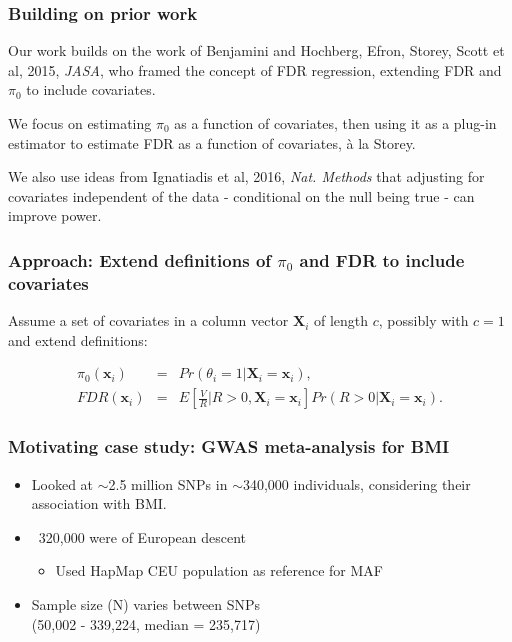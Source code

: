 \documentclass{beamer}
\newcommand{\bX}{\mathbf{X}}
\newcommand{\bx}{\mathbf{x}}
\begin{document}

\begin{frame}
\frametitle{Building on prior work}

Our work builds on the work of Benjamini and Hochberg, Efron, Storey, Scott et al, 2015, \textit{JASA},
who framed the concept of {\color{red}FDR regression}, extending FDR and $\pi_0$ to include covariates.\\ \vspace{0.5cm}

We focus on estimating $\pi_0$ as a function of covariates, then using it as a plug-in estimator to estimate FDR as a function of
covariates, \`{a} la Storey.\\ \vspace{0.5cm}

We also use ideas from Ignatiadis et al, 2016, \textit{Nat. Methods} that adjusting for covariates independent of the data - conditional on 
the null being true - can improve power.

\end{frame}


\begin{frame}
\frametitle{Approach: Extend definitions of $\pi_0$ and FDR to include covariates}

Assume a set of covariates in a column vector $\bX_i$ of length $c$, possibly with $c=1$ and extend definitions:


\begin{eqnarray*}
\pi_0(\bx_i) &=& Pr(\theta_i = 1|\bX_i=\bx_i),\\
FDR(\bx_i) &=& E \left [  \frac{V}{R} \bigg| R > 0, \bX_i=\bx_i \right ] Pr(R > 0|\bX_i=\bx_i).
\end{eqnarray*}


\end{frame}


\begin{frame}
\frametitle{Motivating case study: GWAS meta-analysis for BMI}

\begin{itemize}
\item Looked at $\sim$2.5 million SNPs in $\sim$340,000 individuals, considering their association with BMI.
\vspace{0.5cm}
\item ~320,000 were of European descent
\begin{itemize}
\item Used HapMap CEU population as reference for MAF
\end{itemize}
\vspace{0.5cm}
\item Sample size (N) varies between SNPs \\
(50,002 - 339,224, median = 235,717)
\end{itemize}

\end{frame}
\end{document}
